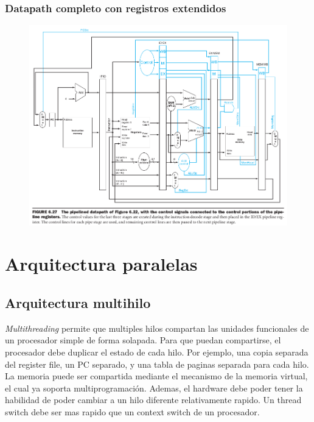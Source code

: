 \documentclass{article}
\begin{document}
\newpage
\subsubsection{Datapath completo con registros extendidos }

\begin{figure}[h!]
    \includegraphics[width=\linewidth]{imagenes/pipeline/pipeline-control-transport.png}
\end{figure}



\newpage
\section{Arquitectura paralelas}

\subsection{Arquitectura multihilo}

\textit{Multithreading} permite que multiples hilos compartan las unidades funcionales de un procesador simple de forma solapada. Para que puedan compartirse, el procesador debe duplicar el estado de cada hilo.
Por ejemplo, una copia separada del register file, un PC separado, y una tabla de paginas separada para cada hilo.
La memoria puede ser compartida mediante el mecanismo de la memoria virtual, el cual ya soporta multiprogramación.
Ademas, el hardware debe poder tener la habilidad de poder cambiar a un hilo diferente relativamente rapido. Un thread switch debe ser mas rapido que un context switch de un procesador.
\end{document}

